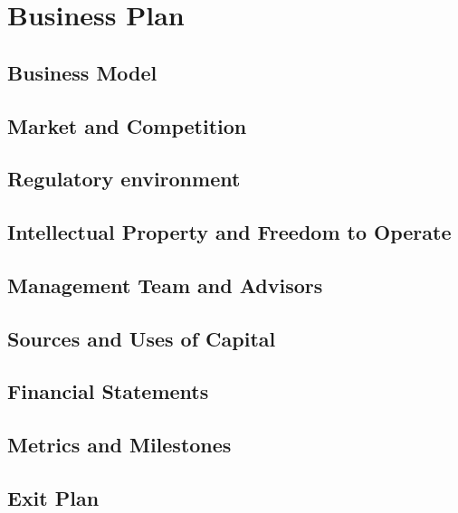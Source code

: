 
\chapter{Business Plan}



\section{Business Model}

\section{Market and Competition}

\section{Regulatory environment}

\section{Intellectual Property and Freedom to Operate}

\section{Management Team and Advisors}

\section{Sources and Uses of Capital}

\section{Financial Statements}

\section{Metrics and Milestones}

\section{Exit Plan}

